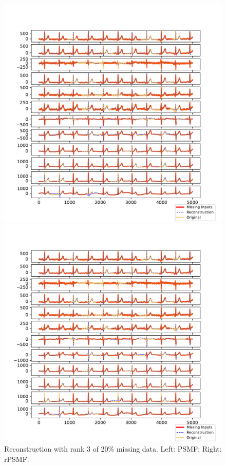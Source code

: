 \documentclass{mldsmsc}
\begin{document}
\begin{figure}[H]
\centering
\begin{minipage}{0.4\linewidth}
    \centering
    \includegraphics[width=\linewidth]{images/missing/psmf_output_20_3.pdf}
\end{minipage}%
\hspace{0.05\linewidth}
\begin{minipage}{0.4\linewidth}
    \centering
    \includegraphics[width=\linewidth]{images/missing/rpsmf_output_20_3.pdf}
\end{minipage}
\caption{Reconstruction with rank 3 of 20\% missing data. Left: PSMF; Right: rPSMF.}
\label{fig:mrec3}
\end{figure}
\end{document}

